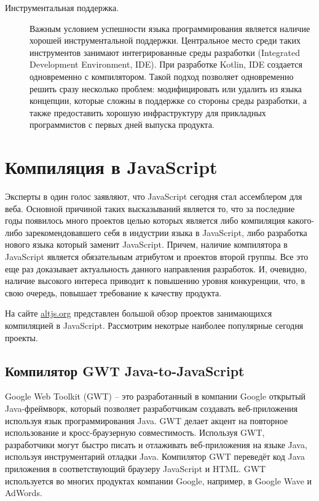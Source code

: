 \begin{description}
	\item[Инструментальная поддержка.] Важным условием успешности языка программирования является наличие хорошей инструментальной поддержки. Центральное место среди таких инструментов занимают интегрированные среды разработки (Integrated Development Environment, IDE).
	При разработке Kotlin, IDE создается одновременно с компилятором. Такой подход позволяет одновременно решить сразу несколько проблем: модифицировать или удалить из языка концепции, которые сложны в поддержке со стороны среды разработки, а также предоставить хорошую инфраструктуру для прикладных программистов с первых дней выпуска продукта.
\end{description}






\section{Компиляция в JavaScript}

Эксперты в один голос заявляют, что JavaScript сегодня стал ассемблером для веба.\cite{JsIsAsm1, JsIsAsm2}
Основной причиной таких высказываний является то, что за последние годы появилось много проектов целью которых является либо компиляция какого-либо зарекомендовавшего себя в индустрии языка в JavaScript, либо разработка нового языка который заменит JavaScript. Причем, наличие компилятора в JavaScript является обязательным атрибутом и проектов второй группы.
Все это еще раз доказывает актуальность данного направления разработок. И, очевидно, наличие высокого интереса приводит к повышению уровня конкуренции, что, в свою очередь, повышает требование к качеству продукта.

На сайте \url{altjs.org} представлен большой обзор проектов занимающихся компиляцией в JavaScript. Рассмотрим некотрые наиболее популярные сегодня проекты.
\cite{langpop}

\subsection{Компилятор GWT Java-to-JavaScript}

Google Web Toolkit (GWT) -- это  разработанный в компании Google открытый Java-фреймворк, который позволяет разработчикам создавать веб-приложения используя язык программирования Java. GWT делает акцент на повторное использование и кросс-браузерную совместимость.
Используя GWT, разработчики могут быстро писать и отлаживать веб-приложения на языке Java, используя инструментарий отладки Java. Компилятор GWT переведёт код Java приложения в соответствующий браузеру JavaScript и HTML.
\cite{wiki:GWT:ru}
GWT используется во многих продуктах компании Google, например, в  Google Wave и AdWords.
\cite{GWT:overview}

